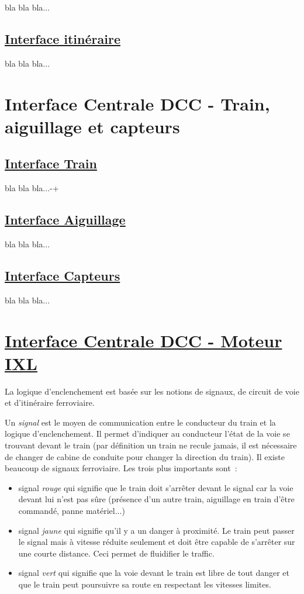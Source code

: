 bla bla bla...

\subsection{\underline{Interface itinéraire}}
\label{sec:ihm_iti}

bla bla bla...



\section{Interface Centrale DCC - Train, aiguillage et capteurs}
\label{sec:int_dcc}

\subsection{\underline{Interface Train}}
\label{sec:int_train}

bla bla bla...-+

\subsection{\underline{Interface Aiguillage}}
\label{sec:int_aig}

bla bla bla...

\subsection{\underline{Interface Capteurs}}
\label{sec:int_cap}

bla bla bla...


\newpage
\section{\underline{Interface Centrale DCC - Moteur IXL}}
\label{sec:int_ixl}   

La logique d'enclenchement est basée sur les notions de signaux, de circuit de voie et d'itinéraire ferroviaire.

Un \emph{signal} est le moyen de communication entre le conducteur du train et la logique d'enclenchement. 
Il permet d'indiquer au conducteur l'état de la voie se trouvant devant le train (par définition un 
train ne recule jamais, il est nécessaire de changer de cabine de conduite pour changer
la direction du train). Il existe beaucoup de signaux ferroviaire. Les trois plus importants sont~:
\begin{itemize}
\item signal \emph{rouge} qui signifie que le train doit s'arrêter devant le signal car la
voie devant lui n'est pas sûre (présence d'un autre train, aiguillage en train d'être commandé, panne 
matériel...)
\item signal \emph{jaune} qui signifie qu'il y a un danger à proximité. Le train peut passer le signal
mais à vitesse réduite seulement et doit être capable de s'arrêter sur une courte distance. Ceci permet 
de fluidifier le traffic.
\item signal \emph{vert} qui signifie que la voie devant le train est libre de tout danger et que le train 
peut poursuivre sa route en respectant les vitesses limites.
\end{itemize}

